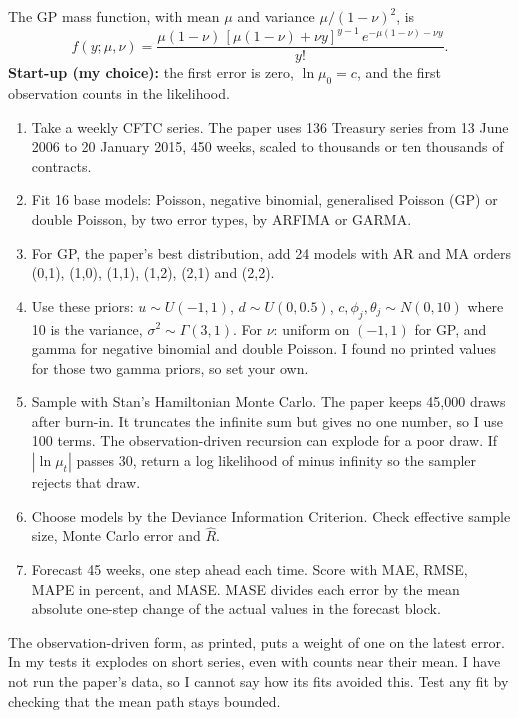 \documentclass[11pt,a4paper]{article}
\newcommand{\sublabel}[1]{\par\vspace{3pt}\needspace{3\baselineskip}{\sffamily\small\bfseries #1}\par\nopagebreak[4]\vspace{1pt}}
\begin{document}
The GP mass function, with mean $\mu$ and variance $\mu/(1-\nu)^2$, is
\[
f(y; \mu, \nu) = \frac{\mu(1-\nu)\,[\mu(1-\nu) + \nu y]^{y-1}\, e^{-\mu(1-\nu) - \nu y}}{y!}.
\]
\textbf{Start-up (my choice):} the first error is zero, $\ln \mu_0 = c$, and the first observation counts in the likelihood.

\sublabel{Steps}
\begin{enumerate}
\item Take a weekly CFTC series. The paper uses 136 Treasury series from 13 June 2006 to 20 January 2015, 450 weeks, scaled to thousands or ten thousands of contracts.
\item Fit 16 base models: Poisson, negative binomial, generalised Poisson (GP) or double Poisson, by two error types, by ARFIMA or GARMA.
\item For GP, the paper's best distribution, add 24 models with AR and MA orders (0,1), (1,0), (1,1), (1,2), (2,1) and (2,2).
\item Use these priors: $u \sim U(-1,1)$, $d \sim U(0, 0.5)$, $c, \phi_j, \theta_j \sim N(0, 10)$ where 10 is the variance, $\sigma^2 \sim \Gamma(3, 1)$. For $\nu$: uniform on $(-1, 1)$ for GP, and gamma for negative binomial and double Poisson. I found no printed values for those two gamma priors, so set your own.
\item Sample with Stan's Hamiltonian Monte Carlo. The paper keeps 45,000 draws after burn-in. It truncates the infinite sum but gives no one number, so I use 100 terms. The observation-driven recursion can explode for a poor draw. If $|\ln \mu_t|$ passes 30, return a log likelihood of minus infinity so the sampler rejects that draw.
\item Choose models by the Deviance Information Criterion. Check effective sample size, Monte Carlo error and $\hat{R}$.
\item Forecast 45 weeks, one step ahead each time. Score with MAE, RMSE, MAPE in percent, and MASE. MASE divides each error by the mean absolute one-step change of the actual values in the forecast block.
\end{enumerate}

\begin{warnbox}
The observation-driven form, as printed, puts a weight of one on the latest error. In my tests it explodes on short series, even with counts near their mean. I have not run the paper's data, so I cannot say how its fits avoided this. Test any fit by checking that the mean path stays bounded.
\end{warnbox}
\end{document}
